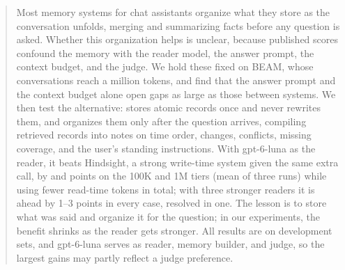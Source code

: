 \begin{abstract}
Most memory systems for chat assistants organize what they store as the conversation unfolds, merging and summarizing
facts before any question is asked. Whether this organization helps is unclear, because published scores confound the memory with the reader model, the answer prompt, the context budget, and the judge. We hold
these fixed on BEAM, whose conversations reach a million tokens, and find that the answer prompt and the context
budget alone open gaps as large as those between systems. We then test the alternative: \method{} stores atomic
records once and never rewrites them, and organizes them only after the question arrives, compiling retrieved records
into notes on time order, changes, conflicts, missing coverage, and the user's standing instructions. With gpt-6-luna
as the reader, it beats Hindsight, a strong write-time system given the same extra call, by  and  points on the 100K and 1M tiers (mean of three runs) while using fewer read-time tokens in total; with three stronger readers it is ahead by 1--3
points in every case, resolved in one. The lesson is to store what was said and organize it for the question; in our experiments, the benefit shrinks as the reader gets stronger. All results are on development sets, and gpt-6-luna serves as reader, memory builder, and judge, so the largest gains may partly reflect a judge preference. 
\end{abstract}
